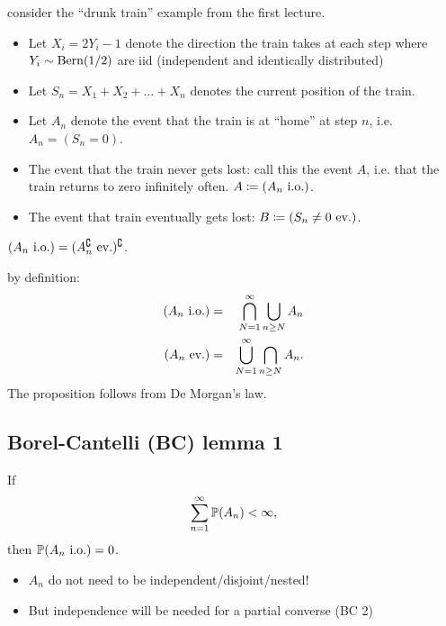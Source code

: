 \documentclass{article}
\begin{document}
 consider the ``drunk train'' example from the first lecture.  
\begin{itemize}
  \item Let $X_i = 2Y_i - 1$ denote the direction the train takes at each step where $Y_i \sim \Bern(1/2)$ are iid (independent and identically distributed)
  \item Let $S_n = X_1 + X_2 + \dots + X_n$ denotes the current position of the train. 
  \item Let $A_n$ denote the event that the train is at ``home'' at step $n$, i.e. $A_n = (S_n = 0)$.
  \item The event that the train never gets lost: call this the event $A$, i.e. that the train returns to zero infinitely often. $A \defeq (A_n\io)$.
  \item The event that train eventually gets lost: $B \defeq (S_n \neq 0\ev)$.
\end{itemize}

 $(A_n\io) = (A_n^\complement\ev)^\complement$.

 by definition:
\begin{eqnarray*}
(A_n\io) &=& \bigcap_{N=1}^\infty \bigcup_{n\ge N} A_n \\
(A_n\ev) &=& \bigcup_{N=1}^\infty \bigcap_{n\ge N} A_n.
\end{eqnarray*}
The proposition follows from De Morgan's law.


\subsection{Borel-Cantelli (BC) lemma 1}

 If \[\sum_{n=1}^\infty \P(A_n) < \infty,\] then $\P(A_n\io) = 0$.

\begin{itemize}
  \item $A_n$ do not need to be independent/disjoint/nested!
  \item But independence will be needed for a partial converse (BC 2)
\end{itemize}
\end{document}
